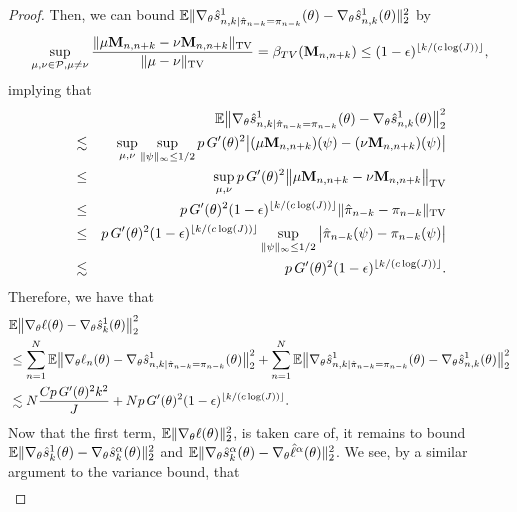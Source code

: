 \begin{proof}
Then, we can bound 
$\mathbb{E}\|\nabla_\theta\hat s_{n,k|\hat\pi_{n-k}=\pi_{n-k}}^1(\theta) - \nabla_\theta\hat s_{n,k}^1(\theta)\|_2^2$ by
\begin{equation}\sup _{\mu, \nu \in \mathcal{P}, \mu \neq \nu} \frac{\|\mu \textbf{M}_{n,n+k}-\nu \textbf{M}_{n,n+k}\|_{\mathrm{TV}}}{\|\mu-\nu\|_{\mathrm{TV}}} = \beta_{TV}(\textbf{M}_{n,n+k}) \leq (1-\epsilon)^{\lfloor k/(c\log(J)) \rfloor},\end{equation}
implying that
\begin{eqnarray}
 && \hspace{-30mm}
    \E\big\|\nabla_\theta\hat s_{n,k|\hat\pi_{n-k}=\pi_{n-k}}^1(\theta) - \nabla_\theta\hat s_{n,k}^1(\theta)\big\|_2^2 
\\
    &\lesssim& \sup_{\mu, \nu} \sup_{\|\psi\|_\infty \leq 1/2} p \, G'(\theta)^2\big|(\mu \textbf{M}_{n,n+k})(\psi)-(\nu \textbf{M}_{n,n+k})(\psi)\big| 
\\
    &\leq& \sup_{\mu, \nu} p \, G'(\theta)^2\big\|\mu \textbf{M}_{n,n+k}-\nu \textbf{M}_{n,n+k}\big\|_{\mathrm{TV}} 
\\
    &\leq& p \, G'(\theta)^2(1-\epsilon)^{\floor{k/(c\log(J))}} \|\hat\pi_{n-k} - \pi_{n-k}\|_{\text{TV}} 
\\
    &\leq& p \, G'(\theta)^2(1-\epsilon)^{\floor{k/(c\log(J))}} \sup_{\|\psi\|_{\infty} \leq 1/2} \big|\hat\pi_{n-k}(\psi) - \pi_{n-k}(\psi)\big| 
\\
    &\lesssim& p \, G'(\theta)^2(1-\epsilon)^{\floor{k/(c\log(J))}}.
\end{eqnarray}
Therefore, we have that
\begin{align}
    &\mathbb{E}\big\|\nabla_\theta\ell(\theta) - \nabla_\theta\hat s_k^1(\theta)\big\|_2^2 \\
    &\leq \sum_{n=1}^N \mathbb{E}\big\|\nabla_\theta\ell_n(\theta) - \nabla_\theta\hat s_{n,k|\hat\pi_{n-k}=\pi_{n-k}}^1(\theta)\big\|_2^2 + \sum_{n=1}^N \mathbb{E}\big\|\nabla_\theta\hat s_{n,k|\hat\pi_{n-k}=\pi_{n-k}}^1(\theta) - \nabla_\theta\hat s_{n,k}^1(\theta)\big\|_2^2\\
    &\lesssim N\frac{Cp \, G'(\theta)^2k^2}{J} + Np \, G'(\theta)^2(1-\epsilon)^{\lfloor k/(c\log(J)) \rfloor}.
\end{align}
Now that the first term, $\mathbb{E}\|\nabla_\theta\ell(\theta)\|_2^2$, is taken care of, it remains to bound 
$\mathbb{E}\|\nabla_\theta\hat s_k^1(\theta) - \nabla_\theta\hat s_k^\alpha(\theta)\|_2^2$ 
and
$\mathbb{E}\|\nabla_\theta\hat s_k^\alpha(\theta) -  \nabla_\theta\hat\ell^\alpha(\theta)\|_2^2$.
We see, by a similar argument to the variance bound, that
\begin{align}

\end{align}
\end{proof}
